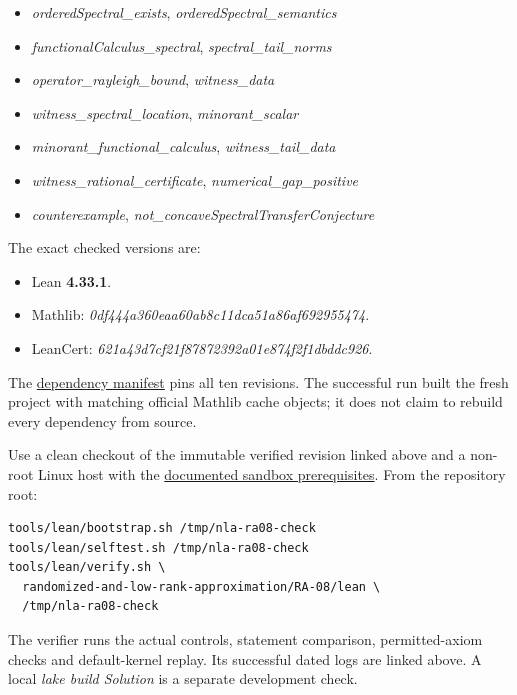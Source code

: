 \documentclass[11pt,a4paper]{article}
\providecommand{\tightlist}{\setlength{\itemsep}{0pt}\setlength{\parskip}{0pt}}
\begin{document}
\begin{itemize}
\tightlist
\item
  \textit{orderedSpectral\_exists}, \textit{orderedSpectral\_semantics}
\item
  \textit{functionalCalculus\_spectral}, \textit{spectral\_tail\_norms}
\item
  \textit{operator\_rayleigh\_bound}, \textit{witness\_data}
\item
  \textit{witness\_spectral\_location}, \textit{minorant\_scalar}
\item
  \textit{minorant\_functional\_calculus}, \textit{witness\_tail\_data}
\item
  \textit{witness\_rational\_certificate},
  \textit{numerical\_gap\_positive}
\item
  \textit{counterexample},
  \textit{not\_concaveSpectralTransferConjecture}
\end{itemize}

The exact checked versions are:

\begin{itemize}
\tightlist
\item
  Lean \textbf{4.33.1}.
\item
  Mathlib: \textit{0df444a360eaa60ab8c11dca51a86af692955474}.
\item
  LeanCert: \textit{621a43d7cf21f87872392a01e874f2f1dbddc926}.
\end{itemize}

The
\href{https://github.com/ajt60gaibb/OpenProblemsInNLA/blob/main/randomized-and-low-rank-approximation/RA-08/lean/lake-manifest.json}{dependency
manifest} pins all ten revisions. The successful run built the fresh
project with matching official Mathlib cache objects; it does not claim
to rebuild every dependency from source.

Use a clean checkout of the immutable verified revision linked above and
a non-root Linux host with the
\href{https://github.com/ajt60gaibb/OpenProblemsInNLA/blob/main/tools/lean/HARNESS.md}{documented
sandbox prerequisites}. From the repository root:

\begin{verbatim}
tools/lean/bootstrap.sh /tmp/nla-ra08-check
tools/lean/selftest.sh /tmp/nla-ra08-check
tools/lean/verify.sh \
  randomized-and-low-rank-approximation/RA-08/lean \
  /tmp/nla-ra08-check
\end{verbatim}

The verifier runs the actual controls, statement comparison,
permitted-axiom checks and default-kernel replay. Its successful dated
logs are linked above. A local \textit{lake build Solution} is a
separate development check.
\end{document}

